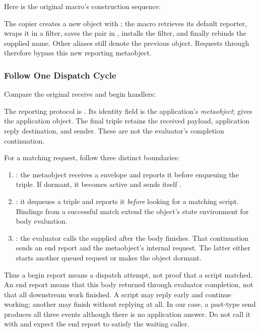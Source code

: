 Here is the original macro's construction sequence:


The copier creates a new object with ; the macro
retrieves its default reporter, wraps it in a filter, saves the pair
 in ,
installs the filter, and finally rebinds the supplied name. Other aliases
still denote the previous object. Requests through 
therefore bypass this new reporting metaobject.

\subsubsection{Follow One Dispatch Cycle}

Compare the original receive and begin handlers:


The reporting protocol is
.
Its identity field is the application's \emph{metaobject};
 gives the application object. The final triple
retains the received payload, application reply destination, and sender.
These are not the evaluator's completion continuation.

For a matching request, follow three distinct boundaries:

\begin{enumerate}
  \item {}: the metaobject receives a 
        envelope and reports it before enqueuing the triple. If dormant,
        it becomes active and sends itself .
  \item {}: it dequeues a triple and reports it \emph{before}
        looking for a matching script. Bindings from a successful match
        extend the object's state environment for body evaluation.
  \item {}: the evaluator calls the supplied  after
        the body finishes. That continuation sends an end report and the
        metaobject's internal  request. The latter either
        starts another queued request or makes the object dormant.
\end{enumerate}

Thus a begin report means a dispatch attempt, not proof that a script
matched. An end report means that this body returned through evaluator
completion, not that all downstream work finished. A script may reply
early and continue working; another may finish without replying at all.
In our  case, a past-type send produces all three events
although there is no application answer. Do not call it with \code{<==}
and expect the end report to satisfy the waiting caller.

